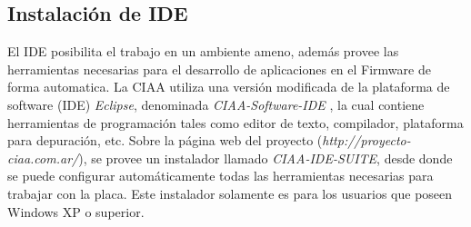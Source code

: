 \documentclass[12pt,letterpaper]{article}
\begin{document}
\subsection{Instalación de IDE}
El IDE posibilita el trabajo en un ambiente ameno, además provee las herramientas necesarias para el desarrollo de aplicaciones en el Firmware de forma automatica. La CIAA utiliza una versión modificada de la plataforma de software (IDE)  \textit{Eclipse}, denominada \textit{CIAA-Software-IDE} , la cual contiene herramientas de programación tales como editor de texto, compilador, plataforma para depuración, etc.
Sobre la página web del proyecto (\textit{http://proyecto-ciaa.com.ar/}), se provee un instalador llamado \textit{CIAA-IDE-SUITE}, desde donde se puede configurar automáticamente todas las herramientas necesarias para trabajar con la placa. Este instalador solamente es para los usuarios que poseen Windows XP o superior.
 \\
\end{document}
